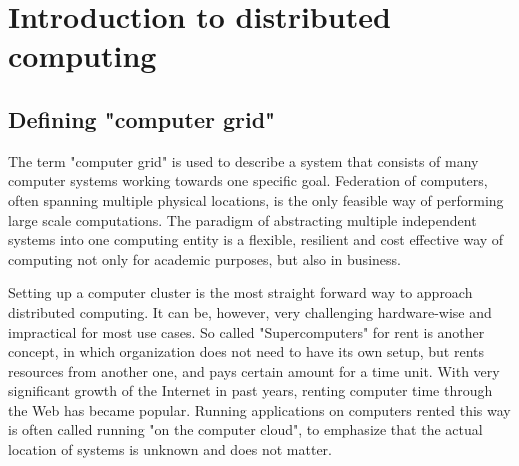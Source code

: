 \chapter{Introduction to distributed computing}

\section{Defining "computer grid"}

\begin{comment}

roadmap:
https://workflowy.com/shared/a2a23b89-e51f-4f48-4fb9-dd4d9194998f/

wprowadzenie

paradigm shift: kiedyś komputery jako wielkie systemy bez interaktywnego dostępu, wykonywanie zadan, długi czas oczekiwania na zadanie
później rewolucja "personal computers", (xerox, apple, ibm, ibm compatible) - interaktywny dostęp, każdy mógł wykonywać swoje obliczenia
teraz obserwujemy kolejną rewolucję (? czy nie nadzbyt dalekoidące wnisoki?) - computer grids, cloud computing, volunteer computing, microsoft xbox one cloud computing for games

co to jest grid, co to jest cloud, co to jest volunteer computing

przykłady już tutaj czy dalej?

"Na jej podstawie została stworzona siec Arpanet, z której wyewoluował ´
Internet, globalna siec komputerowa. Jej powstanie stworzyło nowe mo ´ zliwo ˙ sci ´
przesyłania danych do komputerów, do których uzytkownik nie ma bezpo ˙ srednie- ´
go dost˛epu. Wczesniej przetwarzanie danych było zamkni˛ete w obr˛ebie jedn ´ ego
osrodka."

\end{comment}

The term "computer grid" is used to describe a system that consists of many computer systems working towards one specific goal. Federation of computers, often spanning multiple physical locations, is the only feasible way of performing large scale computations. The paradigm of abstracting multiple independent systems into one computing entity is a flexible, resilient and cost effective way of computing not only for academic purposes, but also in business.

Setting up a computer cluster is the most straight forward way to approach distributed computing. It can be, however, very challenging hardware-wise and impractical for most use cases. So called "Supercomputers" for rent is another concept, in which organization does not need to have its own setup, but rents resources from another one, and pays certain amount for a time unit. With very significant growth of the Internet in past years, renting computer time through the Web has became popular. Running applications on computers rented this way is often called running "on the computer cloud", to emphasize that the actual location of systems is unknown and does not matter.

